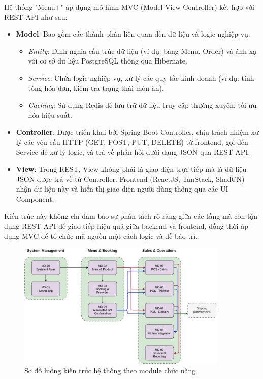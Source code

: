 Hệ thống "Menu+" áp dụng mô hình MVC (Model-View-Controller) kết hợp với REST API như sau:
\begin{itemize}
    \item \textbf{Model}: Bao gồm các thành phần liên quan đến dữ liệu và logic nghiệp vụ:
    \begin{itemize}
        \item \textit{Entity}: Định nghĩa cấu trúc dữ liệu (ví dụ: bảng Menu, Order) và ánh xạ với cơ sở dữ liệu PostgreSQL thông qua Hibernate.
        \item \textit{Service}: Chứa logic nghiệp vụ, xử lý các quy tắc kinh doanh (ví dụ: tính tổng hóa đơn, kiểm tra trạng thái món ăn).
        \item \textit{Caching}: Sử dụng Redis để lưu trữ dữ liệu truy cập thường xuyên, tối ưu hóa hiệu suất.
    \end{itemize}
    \item \textbf{Controller}: Được triển khai bởi Spring Boot Controller, chịu trách nhiệm xử lý các yêu cầu HTTP (GET, POST, PUT, DELETE) từ frontend, gọi đến Service để xử lý logic, và trả về phản hồi dưới dạng JSON qua REST API.
    \item \textbf{View}: Trong REST, View không phải là giao diện trực tiếp mà là dữ liệu JSON được trả về từ Controller. Frontend (ReactJS, TanStack, ShadCN) nhận dữ liệu này và hiển thị giao diện người dùng thông qua các UI Component.
\end{itemize}

Kiến trúc này không chỉ đảm bảo sự phân tách rõ ràng giữa các tầng mà còn tận dụng REST API để giao tiếp hiệu quả giữa backend và frontend, đồng thời áp dụng MVC để tổ chức mã nguồn một cách logic và dễ bảo trì. \\

\begin{figure}[H]
    \centering
    \includegraphics[width=10cm]{Images/kthtm.png}
    \vspace{0.5cm}
    \caption{Sơ đồ luồng kiến trúc hệ thống theo module chức năng}
    \label{fig:my_label}
\end{figure}

